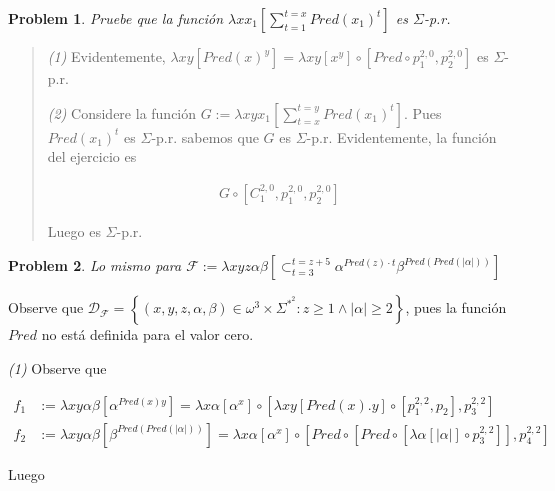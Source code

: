 \documentclass[a4paper, 12pt]{article}
\newtheorem{problem}{Problem}
\newtheorem{problem}{Problem}
\begin{document}
\begin{problem}
    Pruebe que la función $\lambda x x_1 \left[  \sum_{t=1}^{t=x} Pred(x_1)^{t}
    \right]$ es $\Sigma$-p.r. 
\end{problem}


\small
\begin{quote}

\textit{(1)} Evidentemente, $\lambda xy \left[ Pred(x)^y  \right] = \lambda xy
\left[ x^y  \right] \circ \left[ Pred \circ p_1^{2, 0}, p_2^{2, 0} \right] $ es
$\Sigma$-p.r. 

\textit{(2)} Considere la función $G := \lambda xy x_1 \left[ \sum_{t=x}^{t=y}
Pred(x_1)^t  \right]$. Pues $Pred(x_1)^t$ es $\Sigma$-p.r. sabemos que $G$ es
$\Sigma$-p.r. Evidentemente, la función del ejercicio es 

\begin{align*}
    G \circ \left[ C_1^{2, 0}, p_1^{2, 0}, p_2^{2, 0} \right] 
\end{align*}

Luego es $\Sigma$-p.r. 

\end{quote}
\normalsize

\begin{problem}
    Lo mismo para $\mathcal{F} := \lambda xyz \alpha \beta \left[
    \mathop{\subset}_{t=3}^{t=z+5} \alpha^{Pred(z) \cdot t}
\beta^{Pred(Pred(|\alpha|))}   \right]$
\end{problem}

Observe que $\mathcal{D}_{\mathcal{F}} = \left\{ (x, y, z, \alpha, \beta) \in
\omega^3 \times \Sigma^{*}^2 : z \geq 1 \land |\alpha| \geq 2 \right\} $, pues
la función $Pred$ no está definida para el valor cero.  

\textit{(1)} Observe que 

\begin{align*}
    f_1 &:= \lambda xy\alpha\beta \left[ \alpha^{Pred(x) y} \right] = \lambda x\alpha \left[ \alpha^x
    \right] \circ \left[ \lambda xy \left[ Pred(x).y \right] \circ [ p_1^{2, 2}, p_2
    ], p_3^{2, 2} \right]  \\ 
        f_2 &:= \lambda xy\alpha\beta \left[  \beta^{Pred(Pred(|\alpha|))}
        \right] = \lambda x\alpha \left[  \alpha^x \right] \circ \left[ Pred
        \circ \left[ Pred \circ \left[ \lambda \alpha \left[ |\alpha|  \right]
    \circ p_3^{2, 2} \right]  \right], p_4^{2, 2}  \right] 
\end{align*}

Luego 
\end{document}
